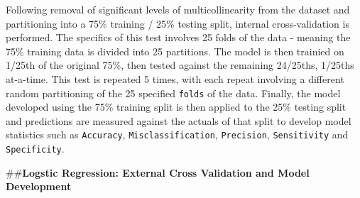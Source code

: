 \documentclass[american,]{article}
\begin{document}
Following removal of significant levels of multicollinearity from the dataset and partitioning into a 75\% training / 25\% testing split, internal cross-validation is performed. The specifics of this test involves 25 folds of the data - meaning the 75\% training data is divided into 25 partitions. The model is then trainied on 1/25th of the original 75\%, then tested against the remaining 24/25ths, 1/25ths at-a-time. This test is repeated 5 times, with each repeat involving a different random partitioning of the 25 specified \texttt{folds} of the data. Finally, the model developed using the 75\% training split is then applied to the 25\% testing split and predictions are measured against the actuals of that split to develop model statistics such as \texttt{Accuracy}, \texttt{Misclassification}, \texttt{Precision}, \texttt{Sensitivity} and \texttt{Specificity}.

\#\#\textbf{Logstic Regression: External Cross Validation and Model Development}
\end{document}
